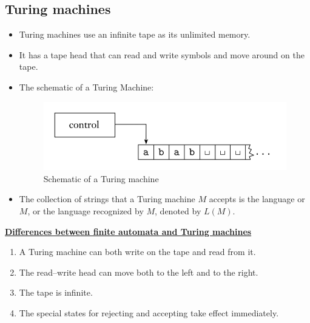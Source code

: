 \documentclass[11pt]{article}
\theoremstyle{definition}
\begin{document}
\subsection{Turing machines}
\begin{itemize}[leftmargin=*]
    \item Turing machines use an infinite tape as its unlimited memory.
    \item It has a tape head that can read and write symbols and move around on the tape.
    \item The schematic of a Turing Machine:
    \begin{figure}[h]
    	\centering
    	\includegraphics[width=0.5\linewidth]{tm.png}
    	\caption{Schematic of a Turing machine}
    	\label{fig}
    \end{figure}
    \item The collection of strings that a Turing machine $M$ accepts is the language or $M$, or the language recognized by $M$, denoted by $L(M)$.
\end{itemize}
\textbf{\underline{Differences between finite automata and Turing machines}}
\begin{enumerate}
    \item A Turing machine can both write on the tape and read from it.
    \item The read–write head can move both to the left and to the right.
    \item The tape is infinite.
    \item The special states for rejecting and accepting take effect immediately.
\end{enumerate}
\end{document}
